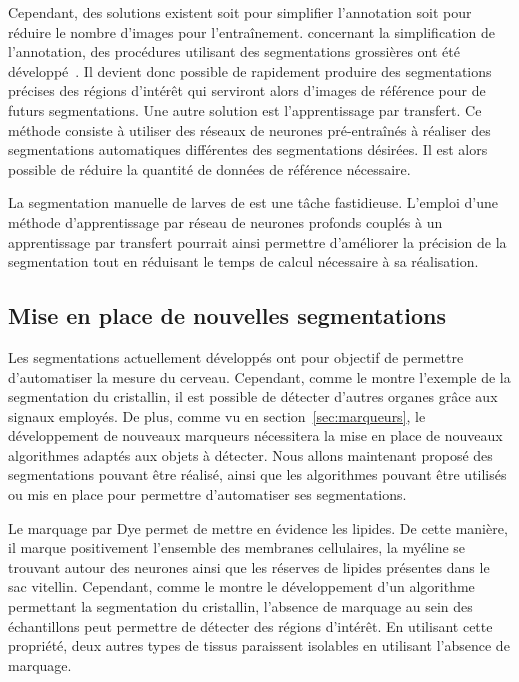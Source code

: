 \documentclass[\main/main.tex]{subfiles}
\begin{document}
%
Cependant, des solutions existent soit pour simplifier l'annotation soit pour réduire le nombre d'images pour l'entraînement.
%
concernant la simplification de l'annotation, des procédures utilisant des segmentations grossières ont été développé~\cite{rajchl_2017}.
%
Il devient donc possible de rapidement produire des segmentations précises des régions d'intérêt qui serviront alors d'images de référence pour de futurs segmentations.
%
Une autre solution est l'apprentissage par transfert.
%
Ce méthode consiste à utiliser des réseaux de neurones pré-entraînés à réaliser des segmentations automatiques différentes des segmentations désirées.
%
Il est alors possible de réduire la quantité de données de référence nécessaire.

%
La segmentation manuelle de larves de \pz{} est une tâche fastidieuse.
%
L'emploi d'une méthode d'apprentissage par réseau de neurones profonds couplés à un apprentissage par transfert pourrait ainsi permettre d'améliorer la précision de la segmentation tout en réduisant le temps de calcul nécessaire à sa réalisation.

    \subsection{Mise en place de nouvelles segmentations}
 
%   
Les segmentations actuellement développés ont pour objectif de permettre d'automatiser la mesure du cerveau.
%
Cependant, comme le montre l'exemple de la segmentation du cristallin,
il est possible de détecter d'autres organes grâce aux signaux employés.
%
De plus, comme vu en section~\ref{sec:marqueurs}, le développement de nouveaux marqueurs nécessitera la mise en place de nouveaux algorithmes adaptés aux objets à détecter.
%
Nous allons maintenant proposé des segmentations pouvant être réalisé, ainsi que les algorithmes pouvant être utilisés ou mis en place pour permettre d'automatiser ses segmentations.

%
Le marquage par Dye permet de mettre en évidence les lipides.
%
De cette manière, il marque positivement l'ensemble des membranes cellulaires, la myéline se trouvant autour des neurones ainsi que les réserves de lipides présentes dans le sac vitellin.
%
Cependant, comme le montre le développement d'un algorithme permettant la segmentation du cristallin, l'absence de marquage au sein des échantillons peut permettre de détecter des régions d'intérêt.
%
En utilisant cette propriété, deux autres types de tissus paraissent isolables en utilisant l'absence de marquage.
%
\end{document}

